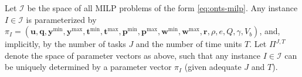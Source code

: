Let $\mathcal{I}$ be the space of all MILP problems of the form \eqref{eq:onts-milp}.
Any instance $I\in \mathcal{I}$ is parameterized by $\pi_I = \left( \bm{u}, \bm{q}, \bm{y}^{\min}, \bm{y}^{\max}, \bm{t}^{\min}, \bm{t}^{\max}, \bm{p}^{\min}, \bm{p}^{\max}, \bm{w}^{\min}, \bm{w}^{\max}, \bm{r}, \rho, e, Q, \gamma, V_b \right) $, and, implicitly, by the number of tasks $J$ and the number of time units $T$.
Let $\Pi^{J,T}$ denote the space of parameter vectors as above, such that any instance $I\in \mathcal{I}$ can be uniquely determined by a parameter vector $\pi_{I}$ (given adequate $J$ and $T$).


